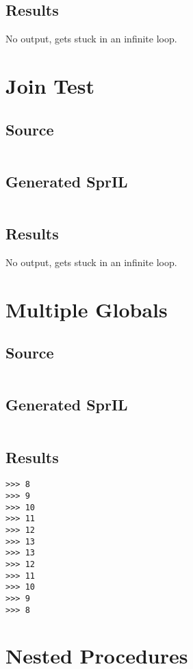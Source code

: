 \documentclass[twoside]{report}
\begin{document}
\subsection{Results}
No output, gets stuck in an infinite loop.

\section{Join Test}
\subsection{Source}
\inputminted[tabsize=4,linenos,firstnumber=1]{text}{../../src/haskell/PP-project-2016/test/join_test.shl}
\subsection{Generated SprIL}
\inputminted[tabsize=4,linenos,firstnumber=0]{text}{../../src/haskell/PP-project-2016/test/join_test_gen.txt}
\subsection{Results}
No output, gets stuck in an infinite loop.

\section{Multiple Globals}
\subsection{Source}
\inputminted[tabsize=4,linenos,firstnumber=1]{text}{../../src/haskell/PP-project-2016/test/multiple_globals.shl}
\subsection{Generated SprIL}
\inputminted[tabsize=4,linenos,firstnumber=0]{text}{../../src/haskell/PP-project-2016/test/multiple_globals_gen.txt}
\subsection{Results}
\begin{verbatim}
>>> 8
>>> 9
>>> 10
>>> 11
>>> 12
>>> 13
>>> 13
>>> 12
>>> 11
>>> 10
>>> 9
>>> 8
\end{verbatim}

\section{Nested Procedures}
\end{document}
